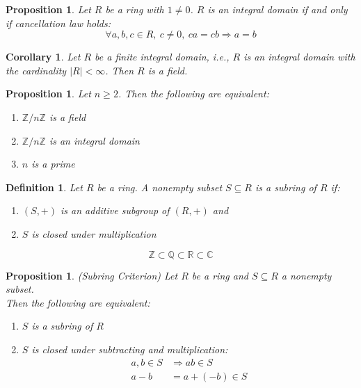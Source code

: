 \documentclass[a4paper,8pt]{article}
\newcommand{\hlt}[1]{\textit{{\color{blue}#1}}}
\theoremstyle{theorem}
\newtheorem{corollary}[theorem]{Corollary}
\newtheorem{proposition}[theorem]{Proposition}
\newtheorem{definition}[theorem]{Definition}
\begin{document}
\begin{proposition}
Let $R$ be a ring with $1 \neq 0$. $R$ is an integral domain if and only if cancellation law holds: 
\begin{equation}
\forall a, b, c \in R, \ c \neq 0, \ ca=cb \Rightarrow a=b \nonumber
\end{equation}
\end{proposition}


\begin{corollary}
Let $R$ be a finite integral domain, i.e., $R$ is an integral domain with the cardinality $\left| R \right| < \infty$. Then $R$ is a field.\\
\end{corollary}


\begin{proposition}
Let $n \geq 2$. Then the following are equivalent:
\begin{enumerate}[label=(\roman*)]
\item $\mathbb{Z}/n\mathbb{Z}$ is a field
\item $\mathbb{Z}/n\mathbb{Z}$ is an integral domain
\item $n$ is a prime
\end{enumerate}
\end{proposition}


\begin{definition}
Let $R$ be a ring. A nonempty subset $S \subseteq R$ is a \hlt{subring} of $R$ if:
\begin{enumerate}[label=(\roman*)]
\item $(S, +)$ is an additive subgroup of $(R, +)$ and
\item $S$ is closed under multiplication
\end{enumerate}
\begin{equation}
\mathbb{Z} \subset \mathbb{Q} \subset \mathbb{R} \subset \mathbb{C} \nonumber
\end{equation}
\end{definition}


\begin{proposition}
\hlt{(Subring Criterion)} Let $R$ be a ring and $S \subseteq R$ a nonempty subset. \\
Then the following are equivalent:
\begin{enumerate}[label=(\roman*)]
\item $S$ is a subring of $R$
\item $S$ is closed under subtracting and multiplication:
\begin{align}
a,b\in S &\Rightarrow ab\in S \nonumber \\
a-b &= a + (-b) \in S \nonumber
\end{align}
\end{enumerate}
\end{proposition}
\end{document}

